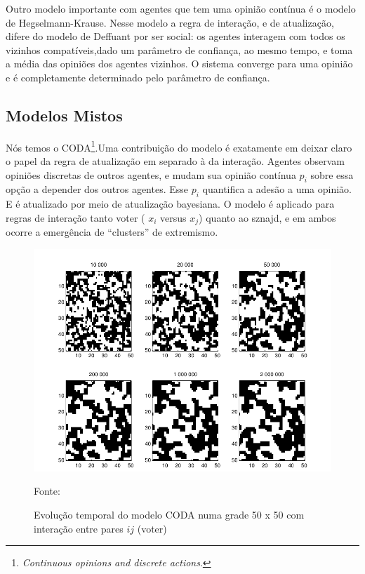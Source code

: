 Outro modelo importante com agentes que tem uma opinião contínua é o modelo de
Hegselmann-Krause. Nesse modelo a regra de interação, e de atualização, difere
do modelo de Deffuant por ser social: os agentes interagem com todos os vizinhos
compatíveis,dado um parâmetro de confiança, ao mesmo tempo, e toma a média das
opiniões dos agentes vizinhos. O sistema converge para uma opinião e é
completamente determinado pelo parâmetro de confiança.




\subsection{Modelos Mistos}

\quad \quad Nós temos o CODA\cite{martins2008continuous}\footnote{\textit{Continuous
    opinions and discrete actions}.}.Uma contribuição do modelo é exatamente em
deixar claro o papel da regra de atualização em separado à da interação. Agentes
observam opiniões discretas de outros agentes, e mudam sua opinião contínua
$p_i$ sobre essa opção a depender dos outros agentes. Esse $p_i$ quantifica a
adesão a uma opinião. E é atualizado por meio de atualização bayesiana. O modelo
é aplicado para regras de interação tanto voter ( $x_i $ versus $x_j$) quanto ao
sznajd, e em ambos ocorre a emergência de ``clusters'' de extremismo. 

\begin{figure}[H]
  \centering \includegraphics[scale = 0.7]{ims/andre.png}
  \caption{Evolução temporal do modelo CODA numa grade 50 x 50 com
    interação entre pares $ij$ (voter)}
  Fonte: 
\end{figure}


